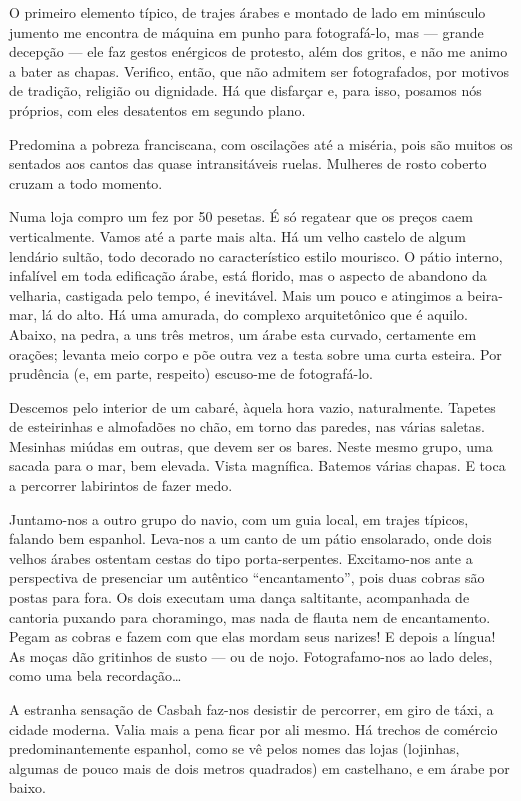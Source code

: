 O primeiro elemento típico, de trajes árabes e montado de lado em minúsculo jumento me encontra de máquina em punho para fotografá-lo, mas --- grande decepção --- ele faz gestos enérgicos de protesto, além dos gritos, e não me animo a bater as chapas. Verifico, então, que não admitem ser fotografados, por motivos de tradição, religião ou dignidade. Há que disfarçar e, para isso, posamos nós próprios, com eles desatentos em segundo plano.

Predomina a pobreza franciscana, com oscilações até a miséria, pois são muitos os sentados aos cantos das quase intransitáveis ruelas. Mulheres de rosto coberto cruzam a todo momento.

Numa loja compro um fez por 50 pesetas. É só regatear que os preços caem verticalmente. Vamos até a parte mais alta. Há um velho castelo de algum lendário sultão, todo decorado no característico estilo mourisco. O pátio interno, infalível em toda edificação árabe, está florido, mas o aspecto de abandono da velharia, castigada pelo tempo, é inevitável. Mais um pouco e atingimos a beira-mar, lá do alto. Há uma amurada, do complexo arquitetônico que é aquilo. Abaixo, na pedra, a uns três metros, um árabe esta curvado, certamente em orações; levanta meio corpo e põe outra vez a testa sobre uma curta esteira. Por prudência (e, em parte, respeito) escuso-me de fotografá-lo.

Descemos pelo interior de um cabaré, àquela hora vazio, naturalmente. Tapetes de esteirinhas e almofadões no chão, em torno das paredes, nas várias saletas. Mesinhas miúdas em outras, que devem ser os bares. Neste mesmo grupo, uma sacada para o mar, bem elevada. Vista magnífica. Batemos várias chapas. E toca a percorrer labirintos de fazer medo.

Juntamo-nos a outro grupo do navio, com um guia local, em trajes típicos, falando bem espanhol. Leva-nos a um canto de um pátio ensolarado, onde dois velhos árabes ostentam cestas do tipo porta-serpentes. Excitamo-nos ante a perspectiva de presenciar um autêntico ``encantamento'', pois duas cobras são postas para fora. Os dois executam uma dança saltitante, acompanhada de cantoria puxando para choramingo, mas nada de flauta nem de encantamento. Pegam as cobras e fazem com que elas mordam seus narizes! E depois a língua! As moças dão gritinhos de susto --- ou de nojo. Fotografamo-nos ao lado deles, como uma bela recordação\ldots

A estranha sensação de Casbah faz-nos desistir de percorrer, em giro de táxi, a cidade moderna. Valia mais a pena ficar por ali mesmo. Há trechos de comércio predominantemente espanhol, como se vê pelos nomes das lojas (lojinhas, algumas de pouco mais de dois metros quadrados) em castelhano, e em árabe por baixo.

